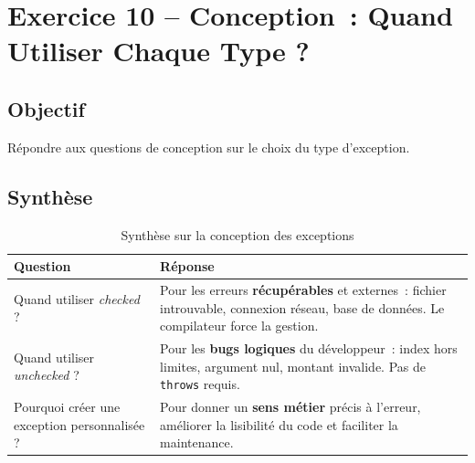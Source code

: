 \section{Exercice 10 -- Conception~: Quand Utiliser Chaque Type ?}

\subsection{Objectif}

Répondre aux questions de conception sur le choix du type d'exception.

\subsection{Synthèse}

\begin{table}[H]
\centering
\begin{tabularx}{0.95\textwidth}{L{4cm} X}
\toprule
\textbf{\color{primarycolor}Question} &
\textbf{\color{primarycolor}Réponse} \\
\midrule
Quand utiliser \textit{checked} ? &
Pour les erreurs \textbf{récupérables} et externes~: fichier introuvable,
connexion réseau, base de données. Le compilateur force la gestion. \\
\addlinespace[0.2cm]
Quand utiliser \textit{unchecked} ? &
Pour les \textbf{bugs logiques} du développeur~: index hors limites,
argument nul, montant invalide. Pas de \texttt{throws} requis. \\
\addlinespace[0.2cm]
Pourquoi créer une exception personnalisée ? &
Pour donner un \textbf{sens métier} précis à l'erreur, améliorer la
lisibilité du code et faciliter la maintenance. \\
\bottomrule
\end{tabularx}
\caption{Synthèse sur la conception des exceptions}
\end{table}
